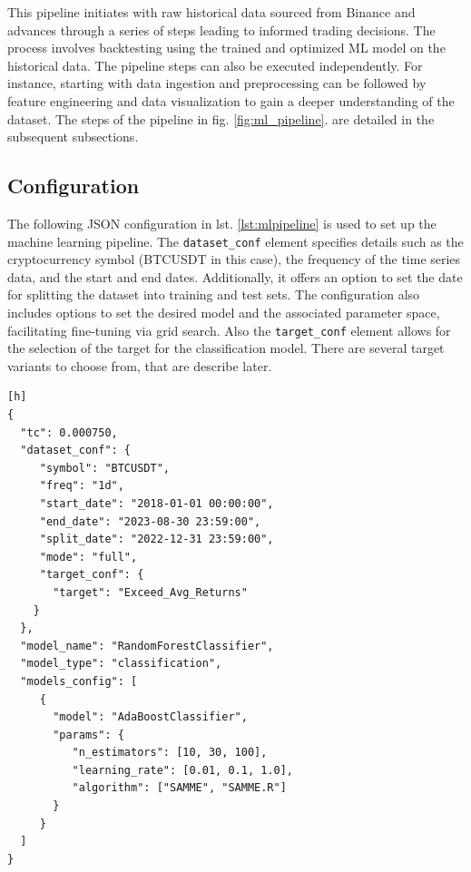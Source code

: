 This pipeline initiates with raw historical data sourced from Binance and advances through a series of steps
leading to informed trading decisions. The process involves backtesting using the trained and optimized ML model on the historical data.
The pipeline steps can also be executed independently.
For instance, starting with data ingestion and preprocessing can be followed by feature engineering and data visualization to gain a deeper understanding of the dataset. The steps of the pipeline in  fig. \ref{fig:ml_pipeline}. are detailed in the subsequent subsections.

\subsection{Configuration}
The following JSON configuration in lst. \ref{lst:mlpipeline} is used to set up the machine learning pipeline.
The \texttt{dataset\_conf} element specifies details such as the cryptocurrency symbol (BTCUSDT in this case), the frequency of the time series data, and the start and end dates.
Additionally, it offers an option to set the date for splitting the dataset into training and test sets.
The configuration also includes options to set the desired model and the associated parameter space, facilitating fine-tuning via grid search.
Also the \texttt{target\_conf} element allows for the selection of the target for the classification model. There are several target variants to choose from, that are describe later.




\begin{lstlisting}[style=jsonstyle, caption={Machine Learning Pipeline Configuration}, label=lst:mlpipeline][h]
{
  "tc": 0.000750,
  "dataset_conf": {
     "symbol": "BTCUSDT",
     "freq": "1d",
     "start_date": "2018-01-01 00:00:00",
     "end_date": "2023-08-30 23:59:00",
     "split_date": "2022-12-31 23:59:00",
     "mode": "full",
     "target_conf": {
       "target": "Exceed_Avg_Returns"
    }
  },
  "model_name": "RandomForestClassifier",
  "model_type": "classification",
  "models_config": [
     {
       "model": "AdaBoostClassifier",
       "params": {
          "n_estimators": [10, 30, 100],
          "learning_rate": [0.01, 0.1, 1.0],
          "algorithm": ["SAMME", "SAMME.R"]
       }
     }
  ]
}
\end{lstlisting}



